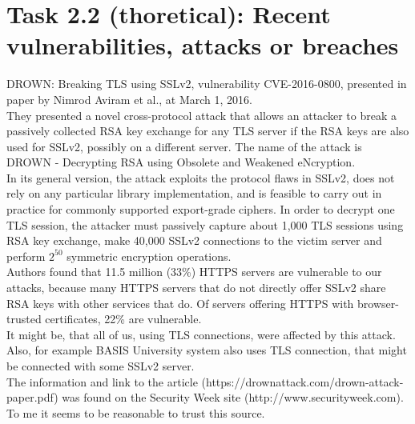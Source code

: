 \documentclass{article}
\begin{document}
\section*{Task 2.2 (thoretical): Recent vulnerabilities, attacks or breaches }
DROWN: Breaking TLS using SSLv2, vulnerability CVE-2016-0800, presented in paper by Nimrod Aviram et al., at March 1, 2016.
\\
They presented a novel cross-protocol attack that allows an attacker to break a passively collected RSA key exchange for any TLS server if the RSA keys are also used for SSLv2, possibly on a different server. The name of the attack is DROWN - Decrypting RSA using Obsolete and Weakened eNcryption.
\\
In its general version, the attack exploits the protocol flaws in SSLv2, does not rely on any particular library implementation, and is feasible to carry out in practice for commonly supported export-grade ciphers. In order to decrypt one TLS session, the attacker must passively capture about 1,000 TLS sessions using RSA key exchange, make 40,000 SSLv2 connections to the victim server and perform $2^{50}$ symmetric encryption operations. 
\\
Authors found that 11.5 million (33\%) HTTPS servers are vulnerable to our attacks, because many HTTPS servers that do not directly offer SSLv2 share RSA keys with other services that do. Of servers offering HTTPS with browser-trusted certificates, 22\% are vulnerable.
\\
It might be, that all of us, using TLS connections, were affected by this attack. Also, for example BASIS University system also uses TLS connection, that might be connected with some SSLv2 server.
\\
The information and link to the article (https://drownattack.com/drown-attack-paper.pdf) was found on the Security Week site (http://www.securityweek.com). To me it seems to be reasonable to trust this source.
\end{document}
